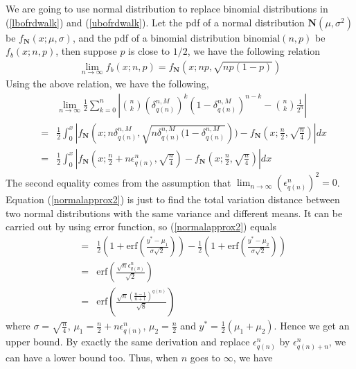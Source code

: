 \documentclass{article}
\begin{document}
We are going to use normal distribution to replace binomial distributions in (\ref{lbofrdwalk}) and (\ref{ubofrdwalk}). Let the pdf of a normal distribution $\mathbf{N}(\mu,\sigma^2)$ be $f_{\mathbf{N}}(x;\mu,\sigma)$, and the pdf of a binomial distribution $\text{binomial}(n,p)$ be $f_b(x;n,p)$, then suppose $p$ is close to $1/2$, we have the following relation
\begin{eqnarray} 
\label{normalapprox}
 \lim_{n \rightarrow \infty}f_b(x;n,p) = f_{\mathbf{N}}(x;np,\sqrt{np(1-p)})
\end{eqnarray}
Using the above relation, we have the following,
\begin{eqnarray}
\label{normalapprox2}
 & &\lim_{n \rightarrow \infty} \frac{1}{2}\sum_{k=0}^n \left|{n \choose k} (\delta^{n,M}_{q(n)})^k 
    (1-\delta^{n,M}_{q(n)})^{n-k} -{n \choose k} \frac{1}{2^n} \right| \nonumber \\
 &=& \frac{1}{2} \int_0^x |f_{\mathbf{N}}(x;n\delta^{n,M}_{q(n)},\sqrt{n\delta^{n,M}_{q(n)}(1-\delta^{n,M}_{q(n)}}))
    -f_{\mathbf{N}}(x;\frac{n}{2},\sqrt{\frac{n}{4}}) | dx \nonumber \\
 &=& \frac{1}{2} \int_0^x |f_{\mathbf{N}}(x;\frac{n}{2}+n\epsilon_{q(n)}^n,\sqrt{\frac{n}{4}})-f_{\mathbf{N}}(x;\frac{n}{2},\sqrt{\frac{n}{4}}) | dx
\end{eqnarray}
The second equality comes from the assumption that $\lim_{n\rightarrow \infty}(\epsilon_{q(n)}^n)^2 = 0$. Equation (\ref{normalapprox2}) is just to find the total variation distance between two normal distributions with the same variance and different means. It can be carried out by using error function, so (\ref{normalapprox2}) equals
\begin{eqnarray}
 & = & \frac{1}{2}\left( 1+\text{erf}(\frac{y^*-\mu_1}{\sigma \sqrt{2}} ) \right)
                    -\frac{1}{2}\left( 1+\text{erf}(\frac{y^*-\mu_2}{\sigma \sqrt{2}} ) \right) \nonumber \\
 & = &  \text{erf}\left(\frac{\sqrt{n}\epsilon^n_{q(n)}}{\sqrt{2}}\right)  \\
 & = &  \text{erf}\left(\frac{\sqrt{n}\left(\frac{n-1}{n+1} \right)^{q(n)}}{\sqrt{8}}\right)
\end{eqnarray}
where $\sigma = \sqrt{\frac{n}{4}}$, $\mu_1=\frac{n}{2}+n\epsilon_{q(n)}^n  $, $\mu_2 = \frac{n}{2} $ and $y^* = \frac{1}{2}(\mu_1+\mu_2)$. Hence we get an upper bound. By exactly the same derivation and replace $\epsilon_{q(n)}^n$ by $\epsilon_{q(n)+n}^n$, we can have a lower bound too. Thus, when $n$ goes to $\infty$, we have
\end{document}
